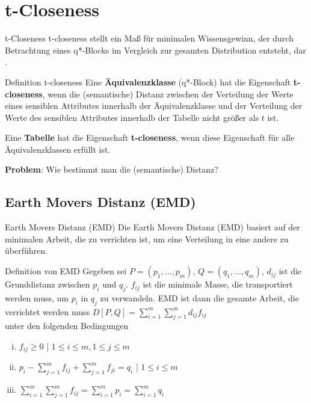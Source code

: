 \section{t-Closeness}

\begin{frame}{t-Closeness}
	t-closeness stellt ein Maß für minimalen Wissensgewinn, der durch Betrachtung eines q*-Blocks im Vergleich zur gesamten Distribution entsteht, dar \cite{kltHauf}.

	\begin{block}{Definition t-closeness}
		Eine \textbf{Äquivalenzklasse} (q*-Block) hat die Eigenschaft \textbf{t-closeness}, wenn die (semantische) Distanz zwischen der Verteilung der Werte eines sensiblen Attributes innerhalb der Äquivalenzklasse und der Verteilung der Werte des sensiblen Attributes innerhalb der Tabelle nicht größer als \(t\) ist. 

		Eine \textbf{Tabelle} hat die Eigenschaft \textbf{t-closeness}, wenn diese Eigenschaft für alle Äquivalenzklassen erfüllt ist.	
	\end{block}

	\textbf{Problem}: Wie bestimmt man die (semantische) Distanz?
\end{frame}

\subsection{Earth Movers Distanz (EMD)}

\begin{frame}{Earth Movers Distanz (EMD)}
	Die Earth Movers Distanz (EMD) basiert auf der minimalen Arbeit, die zu verrichten ist, um eine Verteilung in eine andere zu überführen.
	\begin{block}{Definition von EMD \cite{Li2007t-closseness}}
		Gegeben sei $P=(p_1,...,p_m)$, $Q=(q_1,...,q_m)$, $d_{ij}$ ist die Grunddistanz zwischen $p_i$ und $q_j$. $f_{ij}$ ist die minimale Masse, die transportiert werden muss, um $p_i$ in $q_j$ zu verwandeln. EMD ist dann die gesamte Arbeit, die verrichtet werden muss $D[P,Q] = \sum_{i=1}^m \sum_{j=1}^m d_{ij} f_{ij}$\\
		unter den folgenden Bedingungen
		\begin{enumerate}[i)]
			\item $f_{ij}\ge 0$ | $1\le i \le m, 1\le j \le m$		
			\item $p_i - \sum_{j=1}^{m}f_{ij} +\sum_{j=1}^{m}f_{ji} = q_i$ | $1 \le i \le m$
			\item $\sum_{i=1}^{m}\sum_{j=1}^{m} f_{ij} = \sum_{i=1}^{m} p_i = \sum_{i=1}^{m} q_i$ 
		\end{enumerate}
	\end{block}
\end{frame}

